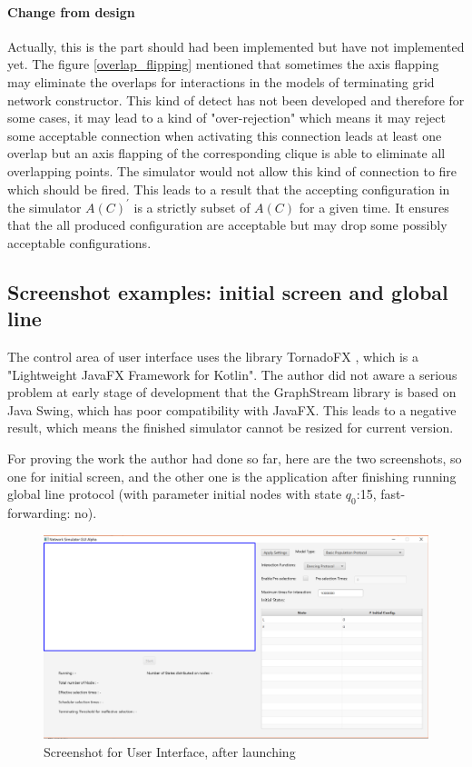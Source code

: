 \paragraph{Change from design}
Actually, this is the part should had been implemented but have not implemented yet. The figure \ref{overlap_flipping} mentioned that sometimes
the axis flapping may eliminate the overlaps for interactions in the models of terminating grid network constructor. This kind of detect has not been developed and therefore for some cases,
it may lead to a kind of "over-rejection" which means it may reject some acceptable connection when activating this connection leads at least one overlap but an axis flapping of the corresponding clique is able to
eliminate all overlapping points. The simulator would not allow this kind of connection to fire which should be fired. This leads to a result that the accepting configuration in the simulator
$A(C)^{'}$ is a strictly subset of $A(C)$ for a given time. It ensures that the all produced configuration are acceptable but may drop some possibly acceptable configurations.

\subsection{Screenshot examples: initial screen and global line}
The control area of user interface uses the library TornadoFX \cite{TornadoFX}, which is a "Lightweight JavaFX Framework for Kotlin".
The author did not aware a serious problem at early stage of development that the GraphStream library is based on Java Swing, which has poor compatibility with JavaFX. This leads to a negative
result, which means the finished simulator cannot be resized for current version.

\par\noindent
For proving the work the author had done so far, here are the two screenshots, so one for initial screen, and the other one is
the application after finishing running global line protocol (with parameter initial nodes with state $q_{0}$:15, fast-forwarding: no).

\begin{figure}[H]
\begin{center}
\includegraphics[width =\textwidth]{context/diagram/InitialScreen.png}
\caption{Screenshot for User Interface, after launching}
\label{capture_start}
\end{center}
\end{figure}

